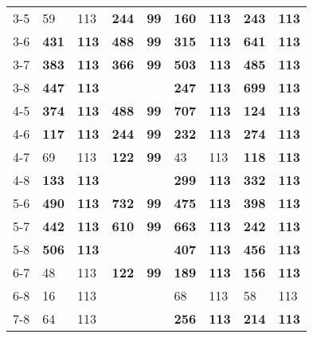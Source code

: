 \begin{table}[ht]
\begin{tabular}{rllllllll}
  3-5 & 59 & 113 & \textbf{244} & \textbf{99} & \textbf{160} & \textbf{113} & \textbf{243} & \textbf{113} \\ 
  3-6 & \textbf{431} & \textbf{113} & \textbf{488} & \textbf{99} & \textbf{315} & \textbf{113} & \textbf{641} & \textbf{113} \\ 
  3-7 & \textbf{383} & \textbf{113} & \textbf{366} & \textbf{99} & \textbf{503} & \textbf{113} & \textbf{485} & \textbf{113} \\ 
  3-8 & \textbf{447} & \textbf{113} &  &  & \textbf{247} & \textbf{113} & \textbf{699} & \textbf{113} \\ 
  4-5 & \textbf{374} & \textbf{113} & \textbf{488} & \textbf{99} & \textbf{707} & \textbf{113} & \textbf{124} & \textbf{113} \\ 
  4-6 & \textbf{117} & \textbf{113} & \textbf{244} & \textbf{99} & \textbf{232} & \textbf{113} & \textbf{274} & \textbf{113} \\ 
  4-7 & 69 & 113 & \textbf{122} & \textbf{99} & 43 & 113 & \textbf{118} & \textbf{113} \\ 
  4-8 & \textbf{133} & \textbf{113} &  &  & \textbf{299} & \textbf{113} & \textbf{332} & \textbf{113} \\ 
  5-6 & \textbf{490} & \textbf{113} & \textbf{732} & \textbf{99} & \textbf{475} & \textbf{113} & \textbf{398} & \textbf{113} \\ 
  5-7 & \textbf{442} & \textbf{113} & \textbf{610} & \textbf{99} & \textbf{663} & \textbf{113} & \textbf{242} & \textbf{113} \\ 
  5-8 & \textbf{506} & \textbf{113} &  &  & \textbf{407} & \textbf{113} & \textbf{456} & \textbf{113} \\ 
  6-7 & 48 & 113 & \textbf{122} & \textbf{99} & \textbf{189} & \textbf{113} & \textbf{156} & \textbf{113} \\ 
  6-8 & 16 & 113 &  &  & 68 & 113 & 58 & 113 \\ 
  7-8 & 64 & 113 &  &  & \textbf{256} & \textbf{113} & \textbf{214} & \textbf{113} \\ 
   \bottomrule
\end{tabular}
\end{table}
